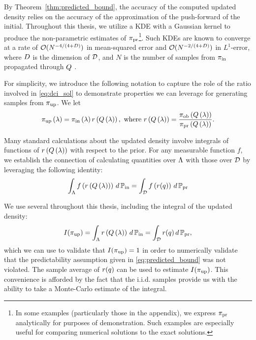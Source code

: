 By Theorem~\ref{thm:predicted_bound}, the accuracy of the computed updated density relies on the accuracy of the approximation of the push-forward of the initial.
Throughout this thesis, we utilize a KDE with a Gaussian kernel to produce the non-parametric estimates of $\operatorname*{\pi_{pr}}$\footnote{
In some examples (particularly those in the appendix), we express $\operatorname*{\pi_{pr}}$ analytically for purposes of demonstration.
Such examples are especially useful for comparing numerical solutions to the exact solutions.
}.
Such KDEs are known to converge at a rate of $\mathcal{O}(N^{-4/(4+D)})$ in mean-squared error and $\mathcal{O}(N^{-2/(4+D)})$ in $L^1$-error, where $D$ is the dimension of $\mathcal{D}$, and $N$ is the number of samples from $\operatorname*{\pi_{in}}$ propagated through $Q$ \citep{Silverman}.

For simplicity, we introduce the following notation to capture the role of the ratio involved in \eqref{eq:dci_sol} to demonstrate properties we can leverage for generating samples from $\operatorname*{\pi_{up}}$.
We let
\[
\operatorname*{\pi_{up}}\left ( \lambda \right ) = \operatorname*{\pi_{in}} \left ( \lambda \right ) r\left ( Q\left ( \lambda \right ) \right ), \text{ where } r\left ( Q\left ( \lambda \right ) \right ) = \frac{\operatorname*{\pi_{ob}}\left ( Q\left ( \lambda \right ) \right )}{\operatorname*{\pi_{pr}}\left ( Q\left ( \lambda \right ) \right )}.
\]

Many standard calculations about the updated density involve integrals of functions of $r\left ( Q\left ( \lambda \right ) \right )$ with respect to the prior.
For any measurable function $f$, we establish the connection of calculating quantities over ${\Lambda}$ with those over $\mathcal{D}$ by leveraging the following identity:
\[
\int_{\Lambda} f\left( r\left ( Q\left ( \lambda \right ) \right ) \right ) \, d\operatorname*{\mathbb{P}_{in}} = \int_{\mathcal{D}} f\left( r(q) \right ) \, d\operatorname*{\mathbb{P}_{pr}}
\]

We use several throughout this thesis, including the integral of the updated density:
\[
I(\operatorname*{\pi_{up}} ) = \int_{\Lambda} r\left ( Q\left ( \lambda \right ) \right ) \, d\operatorname*{\mathbb{P}_{in}} = \int_{\mathcal{D}} r(q) \, d\operatorname*{\mathbb{P}_{pr}} ,
\]
which we can use to validate that $I(\operatorname*{\pi_{up}}) = 1$ in order to numerically validate that the predictability assumption given in \eqref{eq:predicted_bound} was not violated.
The sample average of $r(q)$ can be used to estimate $I(\operatorname*{\pi_{up}})$.
This convenience is afforded by the fact that the i.i.d. samples provide us with the ability to take a Monte-Carlo estimate of the integral.


